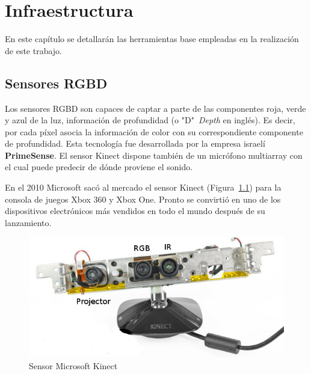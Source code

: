 
\chapter{Infraestructura} %

\label{Chapter3} %

En este capítulo se detallarán las herramientas base empleadas en la realización de este trabajo.


\section{Sensores RGBD}

Los sensores RGBD son capaces de captar a parte de las componentes roja, verde y azul de la luz, información de profundidad (o "D"\ \textit{Depth} en inglés). Es decir, por cada píxel asocia la información de color con su correspondiente componente de profundidad. Esta tecnología fue desarrollada por la empresa israelí \textbf{PrimeSense}. El sensor Kinect dispone también de un micrófono multiarray con el cual puede predecir de dónde proviene el sonido.

En el 2010 Microsoft sacó al mercado el sensor Kinect (Figura~\ref{fig:Kinect}) para la consola de juegos Xbox 360 y Xbox One. Pronto se convirtió en uno de los dispositivos electrónicos más vendidos en todo el mundo después de su lanzamiento.

\begin{figure}[th]
\centering
\includegraphics[scale=0.85]{Figures/ros_kinect.jpg}
\decoRule
\caption[Sensor Kinect]{Sensor Microsoft Kinect}
\label{fig:Kinect}
\end{figure}

